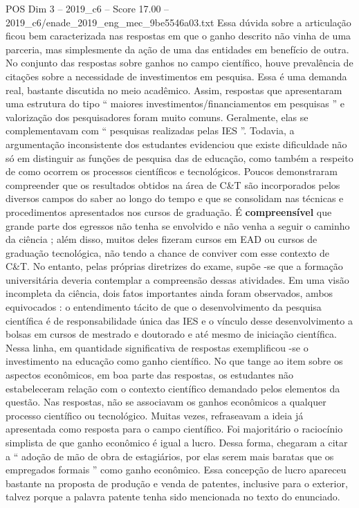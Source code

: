 \begin{textsample}{POS Dim 3 – 2019\_c6 – Score 17.00 – 2019\_c6/enade\_2019\_eng\_mec\_9be5546a03.txt}
Essa dúvida sobre a articulação ficou bem caracterizada nas respostas em que o ganho descrito não vinha de uma parceria, mas simplesmente da ação de uma das entidades em benefício de outra.
No conjunto das respostas sobre ganhos no campo científico, houve prevalência de citações sobre a necessidade de investimentos em pesquisa.
Essa é uma demanda real, bastante discutida no meio acadêmico.
Assim, respostas que apresentaram uma estrutura do tipo “ maiores investimentos/financiamentos em pesquisas ” e valorização dos pesquisadores foram muito comuns.
Geralmente, elas se complementavam com “ pesquisas realizadas pelas IES ”.
Todavia, a argumentação inconsistente dos estudantes evidenciou que existe dificuldade não só em distinguir as funções de pesquisa das de educação, como também a respeito de como ocorrem os processos científicos e tecnológicos.
Poucos demonstraram compreender que os resultados obtidos na área de C\&T são incorporados pelos diversos campos do saber ao longo do tempo e que se consolidam nas técnicas e procedimentos apresentados nos cursos de graduação.
É \textbf{compreensível} que grande parte dos egressos não tenha se envolvido e não venha a seguir o caminho da ciência ; além disso, muitos deles fizeram cursos em EAD ou cursos de graduação tecnológica, não tendo a chance de conviver com esse contexto de C\&T.
No entanto, pelas próprias diretrizes do exame, supõe -se que a formação universitária deveria contemplar a compreensão dessas atividades.
Em uma visão incompleta da ciência, dois fatos importantes ainda foram observados, ambos equivocados : o entendimento tácito de que o desenvolvimento da pesquisa científica é de responsabilidade única das IES e o vínculo desse desenvolvimento a bolsas em cursos de mestrado e doutorado e até mesmo de iniciação científica.
Nessa linha, em quantidade significativa de respostas exemplificou -se o investimento na educação como ganho científico.
No que tange ao item sobre os aspectos econômicos, em boa parte das respostas, os estudantes não estabeleceram relação com o contexto científico demandado pelos elementos da questão.
Nas respostas, não se associavam os ganhos econômicos a qualquer processo científico ou tecnológico.
Muitas vezes, refraseavam a ideia já apresentada como resposta para o campo científico.
Foi majoritário o raciocínio simplista de que ganho econômico é igual a lucro.
Dessa forma, chegaram a citar a “ adoção de mão de obra de estagiários, por elas serem mais baratas que os empregados formais ” como ganho econômico.
Essa concepção de lucro apareceu bastante na proposta de produção e venda de patentes, inclusive para o exterior, talvez porque a palavra patente tenha sido mencionada no texto do enunciado.

\end{textsample}
